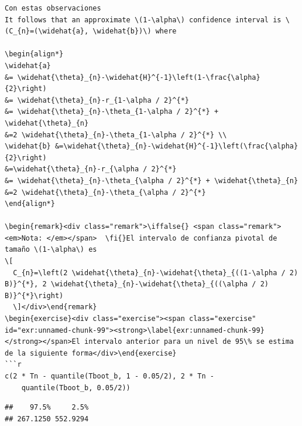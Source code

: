 \documentclass[
  12pt,
]{book}
\theoremstyle{definition}
\theoremstyle{definition}
\theoremstyle{definition}
\newtheorem{exercise}{Ejercicio}[chapter]
\theoremstyle{remark}
\newtheorem*{remark}{Nota: }
\begin{document}
\begin{verbatim}
Con estas observaciones
It follows that an approximate \(1-\alpha\) confidence interval is \(C_{n}=(\widehat{a}, \widehat{b})\) where

\begin{align*}
\widehat{a}
&= \widehat{\theta}_{n}-\widehat{H}^{-1}\left(1-\frac{\alpha}{2}\right)
&= \widehat{\theta}_{n}-r_{1-\alpha / 2}^{*}
&= \widehat{\theta}_{n}-\theta_{1-\alpha / 2}^{*} + \widehat{\theta}_{n}
&=2 \widehat{\theta}_{n}-\theta_{1-\alpha / 2}^{*} \\
\widehat{b} &=\widehat{\theta}_{n}-\widehat{H}^{-1}\left(\frac{\alpha}{2}\right)
&=\widehat{\theta}_{n}-r_{\alpha / 2}^{*}
&= \widehat{\theta}_{n}-\theta_{\alpha / 2}^{*} + \widehat{\theta}_{n}
&=2 \widehat{\theta}_{n}-\theta_{\alpha / 2}^{*}
\end{align*}

\begin{remark}<div class="remark">\iffalse{} <span class="remark"><em>Nota: </em></span>  \fi{}El intervalo de confianza pivotal de tamaño \(1-\alpha\) es
\[
  C_{n}=\left(2 \widehat{\theta}_{n}-\widehat{\theta}_{((1-\alpha / 2) B)}^{*}, 2 \widehat{\theta}_{n}-\widehat{\theta}_{((\alpha / 2) B)}^{*}\right)
  \]</div>\end{remark}
\begin{exercise}<div class="exercise"><span class="exercise" id="exr:unnamed-chunk-99"><strong>\label{exr:unnamed-chunk-99} </strong></span>El intervalo anterior para un nivel de 95\% se estima de la siguiente forma</div>\end{exercise}
```r
c(2 * Tn - quantile(Tboot_b, 1 - 0.05/2), 2 * Tn - 
    quantile(Tboot_b, 0.05/2))
\end{verbatim}

\begin{verbatim}
##    97.5%     2.5% 
## 267.1250 552.9294
\end{verbatim}
\end{document}
